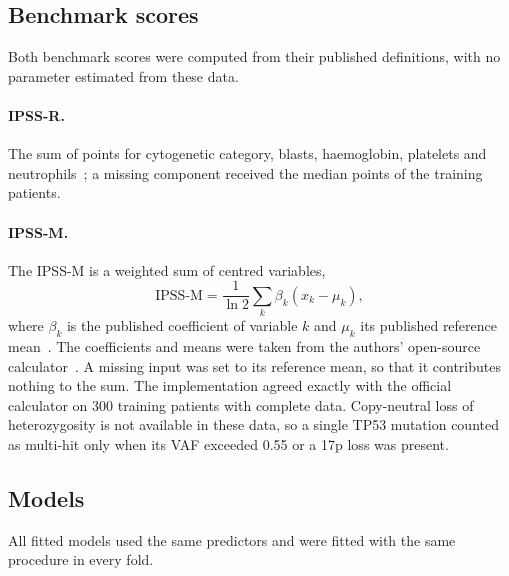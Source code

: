\documentclass[10pt,letterpaper]{article}
\begin{document}
\subsection*{Benchmark scores}
Both benchmark scores were computed from their published definitions, with no parameter
estimated from these data.

\paragraph*{IPSS-R.} The sum of points for cytogenetic category, blasts, haemoglobin,
platelets and neutrophils~\cite{greenberg2012}; a missing component received the median
points of the training patients.

\paragraph*{IPSS-M.} The IPSS-M is a weighted sum of centred variables,
\begin{equation}
\text{IPSS-M} = \frac{1}{\ln 2}\sum_{k} \beta_k \left(x_k - \mu_k\right),
\label{eq:ipssm}
\end{equation}
where $\beta_k$ is the published coefficient of variable $k$ and $\mu_k$ its published
reference mean~\cite{bernard2022}. The coefficients and means were taken from the authors'
open-source calculator~\cite{ipssmcalc}. A missing input was set to its reference mean,
so that it contributes nothing to the sum. The implementation agreed exactly with the
official calculator on 300 training patients with complete data. Copy-neutral loss of
heterozygosity is not available in these data, so a single TP53 mutation counted as
multi-hit only when its VAF exceeded 0.55 or a 17p loss was present.

\subsection*{Models}
All fitted models used the same predictors and were fitted with the same procedure in every
fold.
\end{document}
